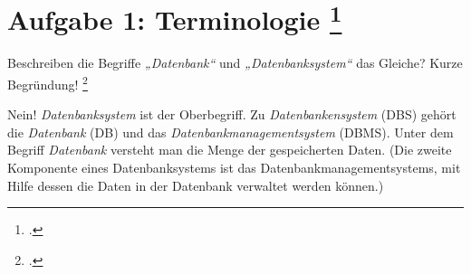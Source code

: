 \documentclass{lehramt-informatik-aufgabe}
\begin{document}

\section{Aufgabe 1: Terminologie
\footcite[Seite 1]{db:ab:1}}

\noindent
Beschreiben die Begriffe \emph{„Datenbank“} und \emph{„Datenbanksystem“}
das Gleiche? Kurze Begründung!
\footcite[13]{winter}

\begin{antwort}
Nein! \emph{Datenbanksystem} ist der Oberbegriff. Zu
\emph{Datenbankensystem} (DBS) gehört die \emph{Datenbank} (DB) und das
\emph{Datenbankmanagementsystem} (DBMS). Unter dem Begriff
\emph{Datenbank} versteht man die Menge der gespeicherten Daten.
(Die zweite
Komponente eines Datenbanksystems ist das Datenbankmanagementsystems,
mit Hilfe dessen die Daten in der Datenbank verwaltet werden können.)
\end{antwort}
\end{document}
